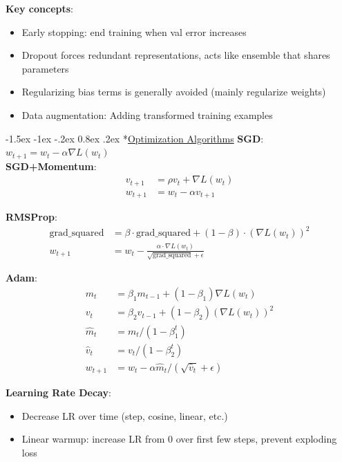 \documentclass{article}
\makeatletter
\renewcommand\section{\@startsection{section}{1}{\z@}%
                                  {-1.5ex \@plus -1ex \@minus -.2ex}%
                                  {0.8ex \@plus.2ex}%
                                  {\normalfont\small\bfseries}}
\makeatother
\begin{document}
\begin{multicols}{3}
\textbf{Key concepts}:
\begin{itemize}
\item Early stopping: end training when val error increases
\item Dropout forces redundant representations, acts like ensemble that shares parameters
\item Regularizing bias terms is generally avoided (mainly regularize weights)
\item Data augmentation: Adding transformed training examples
\end{itemize}

\section*{\underline{Optimization Algorithms}}
\textbf{SGD}: $w_{t+1} = w_t - \alpha \nabla L(w_t)$\\
\textbf{SGD+Momentum}: 
\begin{align*}
v_{t+1} &= \rho v_t + \nabla L(w_t) \tag{typically $\rho = 0.9$ or $0.99$}\\
w_{t+1} &= w_t - \alpha v_{t+1}
\end{align*}

\textbf{RMSProp}:
\begin{align*}
\text{grad\_squared} &= \beta \cdot \text{grad\_squared} + (1-\beta) \cdot (\nabla L(w_t))^2\\
w_{t+1} &= w_t - \frac{\alpha \cdot \nabla L(w_t)}{\sqrt{\text{grad\_squared}} + \epsilon}
\end{align*}

\textbf{Adam}:
\begin{align*}
m_t &= \beta_1 m_{t-1} + (1-\beta_1)\nabla L(w_t) \tag{momentum}\\
v_t &= \beta_2 v_{t-1} + (1-\beta_2)(\nabla L(w_t))^2 \tag{RMSProp}\\
\hat{m}_t &= m_t / (1-\beta_1^t) \tag{bias correction}\\
\hat{v}_t &= v_t / (1-\beta_2^t) \tag{bias correction}\\
w_{t+1} &= w_t - \alpha \hat{m}_t / (\sqrt{\hat{v}_t} + \epsilon)
\end{align*}

\textbf{Learning Rate Decay}:
\begin{itemize}
\item Decrease LR over time (step, cosine, linear, etc.)
\item Linear warmup: increase LR from 0 over first few steps, prevent exploding loss
\end{itemize}


\end{multicols}
\end{document}
